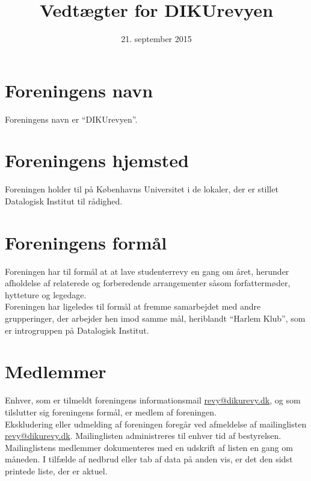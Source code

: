 \documentclass[a4paper,11pt,danish]{article}
\title{Vedtægter for DIKUrevyen}
\date{21. september 2015}
\begin{document}
\maketitle

%

\section{Foreningens navn}
Foreningens navn er "`DIKUrevyen"'.

\section{Foreningens hjemsted}
Foreningen holder til på Københavns Universitet i de lokaler, der er stillet
Datalogisk Institut til rådighed.

\section{Foreningens formål}
Foreningen har til formål at at lave studenterrevy en gang om året, herunder
afholdelse af relaterede og forberedende arrangementer såsom forfattermøder,
hytteture og legedage.\\

\noindent Foreningen har ligeledes til formål at fremme samarbejdet med andre
grupperinger, der arbejder hen imod samme mål, heriblandt "`Harlem Klub"', som
er introgruppen på Datalogisk Institut.

\section{Medlemmer}
Enhver, som er tilmeldt foreningens informationsmail \url{revy@dikurevy.dk},
og som tilslutter sig foreningens formål, er medlem af foreningen.\\

\noindent Ekskludering eller udmelding af foreningen foregår ved afmeldelse af
mailinglisten \url{revy@dikurevy.dk}. Mailinglisten administreres til enhver tid
af bestyrelsen.\\

\noindent Mailinglistens medlemmer dokumenteres med en udskrift af listen en
gang om måneden. I tilfælde af nedbrud eller tab af data på anden vis, er det
den sidst printede liste, der er aktuel.
\end{document}
